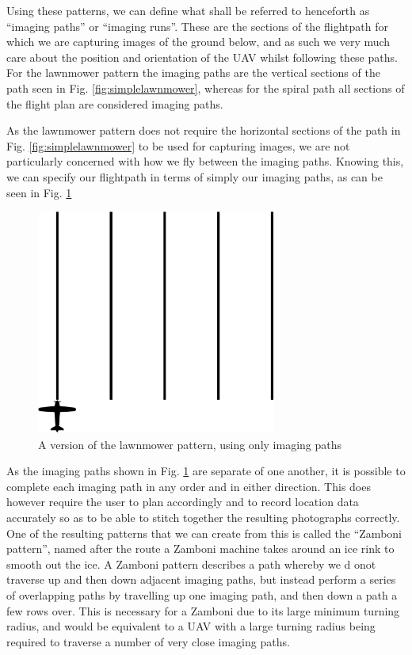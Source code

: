 Using these patterns, we can define what shall be referred to henceforth as ``imaging paths'' or ``imaging runs''. These are the sections of the flightpath for which we are capturing images of the ground below, and as such we very much care about the position and orientation of the UAV whilst following these paths. For the lawnmower pattern the imaging paths are the vertical sections of the path seen in Fig. \ref{fig:simplelawnmower}, whereas for the spiral path all sections of the flight plan are considered imaging paths. 

As the lawnmower pattern does not require the horizontal sections of the path in Fig. \ref{fig:simplelawnmower} to be used for capturing images, we are not particularly concerned with how we fly between the imaging paths. Knowing this, we can specify our flightpath in terms of simply our imaging paths, as can be seen in Fig. \ref{fig:imaginglawnmower}

\begin{figure}[htbp!] 
\centering    
\includegraphics[width=0.7\textwidth]{ImagingLawnmower}
\caption[Imaging Lawnmower Pattern]{A version of the lawnmower pattern, using only imaging paths}
\label{fig:imaginglawnmower}
\end{figure}

As the imaging paths shown in Fig. \ref{fig:imaginglawnmower} are separate of one another, it is possible to complete each imaging path in any order and in either direction. This does however require the user to plan accordingly and to record location data accurately so as to be able to stitch together the resulting photographs correctly. One of the resulting patterns that we can create from this is called the ``Zamboni pattern'', named after the route a Zamboni machine takes around an ice rink to smooth out the ice. A Zamboni pattern describes a path whereby we d onot traverse up and then down adjacent imaging paths, but instead perform a series of overlapping paths by travelling up one imaging path, and then down a path a few rows over. This is necessary for a Zamboni due to its large minimum turning radius, and would be equivalent to a UAV with a large turning radius being required to traverse a number of very close imaging paths. 

